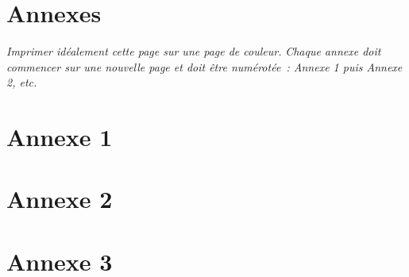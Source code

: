\stopcontents[default]
\resumecontents[annexes]
\chapter*{Annexes}

\begin{center}
\textit{Imprimer idéalement cette page sur une page de couleur.}
\textit{Chaque annexe doit commencer sur une nouvelle page et doit être numérotée : Annexe 1 puis Annexe 2, etc.}
\end{center}


\chapter*{Annexe 1}


\chapter*{Annexe 2}


\chapter*{Annexe 3}


\stopcontents[annexes]
\resumecontents[default]
